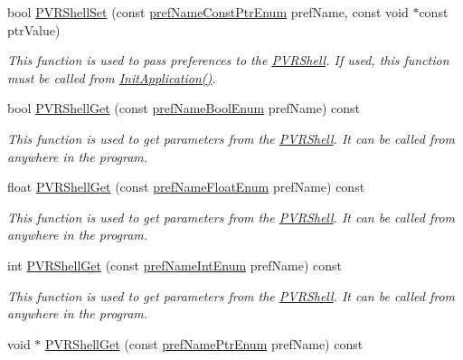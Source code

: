 \begin{DoxyCompactItemize}
bool \hyperlink{class_p_v_r_shell_a62b4296ffb2bd73691f5bfc2ea1d2abd}{P\+V\+R\+Shell\+Set} (const \hyperlink{_p_v_r_shell_8h_af13725186b1491b5d72cd42920b7bc73}{pref\+Name\+Const\+Ptr\+Enum} pref\+Name, const void $\ast$const ptr\+Value)
\begin{DoxyCompactList}\small\item\em This function is used to pass preferences to the \hyperlink{class_p_v_r_shell}{P\+V\+R\+Shell}. If used, this function must be called from \hyperlink{class_p_v_r_shell_a1ecb1d7021a3cc3f533acddc5ba8c1ce}{Init\+Application()}. \end{DoxyCompactList}\item 
bool \hyperlink{class_p_v_r_shell_ad58b00376cdae7a8aeea41fc17367bfd}{P\+V\+R\+Shell\+Get} (const \hyperlink{_p_v_r_shell_8h_a3fa86f089e589b4785ebb9a217b9f8c5}{pref\+Name\+Bool\+Enum} pref\+Name) const 
\begin{DoxyCompactList}\small\item\em This function is used to get parameters from the \hyperlink{class_p_v_r_shell}{P\+V\+R\+Shell}. It can be called from anywhere in the program. \end{DoxyCompactList}\item 
float \hyperlink{class_p_v_r_shell_a8aa8893ca63cc3ee063c10b79d0ff151}{P\+V\+R\+Shell\+Get} (const \hyperlink{_p_v_r_shell_8h_a428ec8d292e36ac8dbc77044dc25075c}{pref\+Name\+Float\+Enum} pref\+Name) const 
\begin{DoxyCompactList}\small\item\em This function is used to get parameters from the \hyperlink{class_p_v_r_shell}{P\+V\+R\+Shell}. It can be called from anywhere in the program. \end{DoxyCompactList}\item 
int \hyperlink{class_p_v_r_shell_ad8f9778d18bdb8ef3e7118a6a39ee300}{P\+V\+R\+Shell\+Get} (const \hyperlink{_p_v_r_shell_8h_a78ec4653192043575302f1448ae7054e}{pref\+Name\+Int\+Enum} pref\+Name) const 
\begin{DoxyCompactList}\small\item\em This function is used to get parameters from the \hyperlink{class_p_v_r_shell}{P\+V\+R\+Shell}. It can be called from anywhere in the program. \end{DoxyCompactList}\item 
void $\ast$ \hyperlink{class_p_v_r_shell_ac02af54ff87ebad661fb4793e848a9fe}{P\+V\+R\+Shell\+Get} (const \hyperlink{_p_v_r_shell_8h_a946b110b552f1d833e359e6517647330}{pref\+Name\+Ptr\+Enum} pref\+Name) const 

\end{DoxyCompactItemize}
